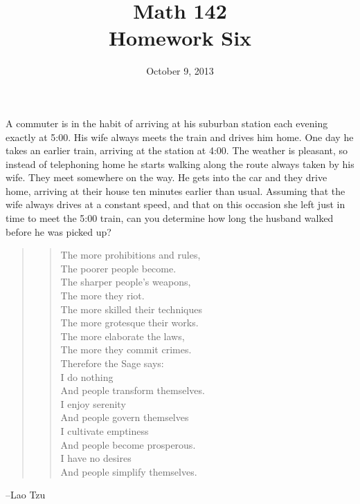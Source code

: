 \documentclass{exam}
\author{}
\date{October 9, 2013}
\title{Math 142 \\ Homework Six}
\begin{document}
  \maketitle

  A commuter is in the habit of arriving at his suburban station each evening exactly at 5:00.  His wife always meets
  the train and drives him home.  One day he takes an earlier train, arriving at the station at 4:00.  The weather is
  pleasant, so instead of telephoning home he starts walking along the route always taken by his wife.  They meet
  somewhere on the way.  He gets into the car and they drive home, arriving at their house ten minutes earlier than
  usual.  Assuming that the wife always drives at a constant speed, and that on this occasion she left just in time to
  meet the 5:00 train, can you determine how long the husband walked before he was picked up?

  \vspace{4 cm}
  \begin{quote}
    \begin{em}
      \begin{verse}
        The more prohibitions and rules, \\
        The poorer people become. \\
        The sharper people's weapons, \\
        The more they riot. \\
        The more skilled their techniques \\
        The more grotesque their works. \\
        The more elaborate the laws, \\
        The more they commit crimes. \\
        \vspace{.2 cm}
        Therefore the Sage says: \\
        \vspace{.2 cm}
        I do nothing \\
        And people transform themselves. \\
        I enjoy serenity \\
        And people govern themselves \\
        I cultivate emptiness \\
        And people become prosperous. \\
        I have no desires \\
        And people simplify themselves. \\
      \end{verse}

    \end{em}
  \end{quote}
  \hspace{2 cm} --Lao Tzu
\end{document}
